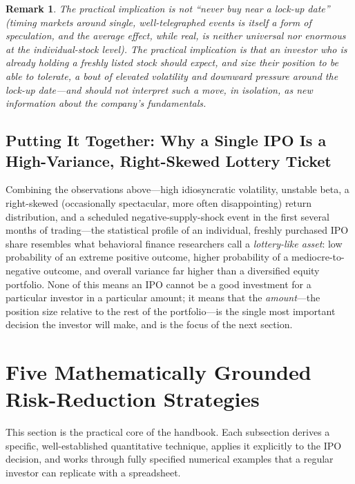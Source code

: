 \documentclass[conference]{IEEEtran}
\newtheorem{remark}{Remark}
\begin{document}
\begin{remark}
The practical implication is not ``never buy near a lock-up date'' (timing markets around single, well-telegraphed events is itself a form of speculation, and the average effect, while real, is neither universal nor enormous at the individual-stock level). The practical implication is that an investor who is already holding a freshly listed stock should \emph{expect}, and size their position to be able to tolerate, a bout of elevated volatility and downward pressure around the lock-up date---and should not interpret such a move, in isolation, as new information about the company's fundamentals.
\end{remark}

\subsection{Putting It Together: Why a Single IPO Is a High-Variance, Right-Skewed Lottery Ticket}

Combining the observations above---high idiosyncratic volatility, unstable beta, a right-skewed (occasionally spectacular, more often disappointing) return distribution, and a scheduled negative-supply-shock event in the first several months of trading---the statistical profile of an individual, freshly purchased IPO share resembles what behavioral finance researchers call a \emph{lottery-like asset}: low probability of an extreme positive outcome, higher probability of a mediocre-to-negative outcome, and overall variance far higher than a diversified equity portfolio. None of this means an IPO cannot be a good investment for a particular investor in a particular amount; it means that the \emph{amount}---the position size relative to the rest of the portfolio---is the single most important decision the investor will make, and is the focus of the next section.

\section{Five Mathematically Grounded Risk-Reduction Strategies}
\label{sec:strategies}

This section is the practical core of the handbook. Each subsection derives a specific, well-established quantitative technique, applies it explicitly to the IPO decision, and works through fully specified numerical examples that a regular investor can replicate with a spreadsheet.
\end{document}
